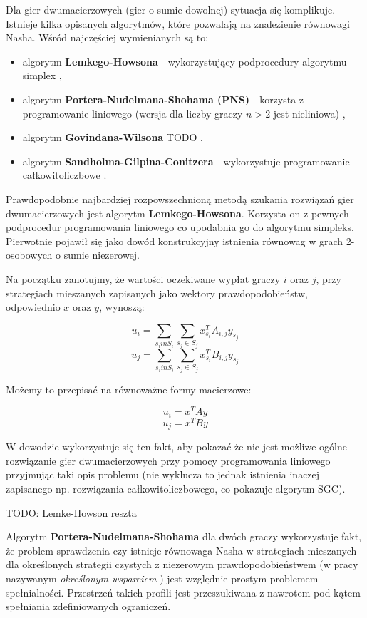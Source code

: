 \documentclass[polish]{standalone}
\begin{document}
Dla gier dwumacierzowych (gier o sumie dowolnej) sytuacja się komplikuje. Istnieje kilka opisanych algorytmów, które
pozwalają na znalezienie równowagi Nasha. Wśród najczęściej wymienianych są to:
\begin{itemize}
\item algorytm \textbf{Lemkego-Howsona} - wykorzystujący podprocedury algorytmu simplex \cite{LH-NE},
\item algorytm \textbf{Portera-Nudelmana-Shohama (PNS)} - korzysta z programowanie liniowego (wersja dla liczby graczy
$n > 2$ jest nieliniowa) \cite{PNS-NE},
\item algorytm \textbf{Govindana-Wilsona} TODO \cite{GR-NE},
\item algorytm \textbf{Sandholma-Gilpina-Conitzera} - wykorzystuje programowanie całkowitoliczbowe \cite{SCG-NE}.
\end{itemize}

Prawdopodobnie najbardziej rozpowszechnioną metodą szukania rozwiązań gier dwumacierzowych jest algorytm
\textbf{Lemkego-Howsona}. Korzysta on z pewnych podprocedur programowania liniowego co upodabnia go do algorytmu
simpleks. Pierwotnie pojawił się jako dowód konstrukcyjny istnienia równowag w grach 2-osobowych o sumie niezerowej.

Na początku zanotujmy, że wartości oczekiwane wypłat graczy $i$ oraz $j$, przy strategiach mieszanych zapisanych jako wektory prawdopodobieństw, odpowiednio $x$ oraz $y$, wynoszą:

$$u_i = \sum_{s_i in S_i}\sum_{s_j \in S_j} x_{s_i}^{T} A_{i,j} y_{s_j}$$
$$u_j = \sum_{s_i in S_i}\sum_{s_j \in S_j} x_{s_i}^{T} B_{i,j} y_{s_j}$$

Możemy to przepisać na równoważne formy macierzowe:

$$u_i = x^{T} A y$$
$$u_j = x^{T} B y$$

W dowodzie wykorzystuje się ten fakt, aby pokazać że nie jest możliwe ogólne rozwiązanie gier dwumacierzowych przy
pomocy programowania liniowego przyjmując taki opis problemu (nie wyklucza to jednak istnienia inaczej zapisanego np.
rozwiązania całkowitoliczbowego, co pokazuje algorytm SGC).

TODO: Lemke-Howson reszta

Algorytm \textbf{Portera-Nudelmana-Shohama} dla dwóch graczy wykorzystuje fakt, że problem sprawdzenia czy istnieje
równowaga Nasha w strategiach mieszanych dla określonych strategii czystych z niezerowym prawdopodobieństwem (w pracy
nazywanym \textit{określonym wsparciem} ) jest względnie prostym problemem spełnialności.
Przestrzeń takich profili jest przeszukiwana z nawrotem pod kątem spełniania zdefiniowanych ograniczeń.
\end{document}
